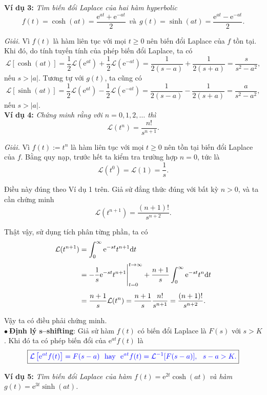 \documentclass[10pt, a4paper]{article}
\begin{document}
	\textbf{Ví dụ 3:} \textit{Tìm biến đổi Laplace của hai hàm hyperbolic} $$f(t)=\cosh(at)=\frac{\mathrm e^{at}+\mathrm e^{-at}}{2}~~\textit{và}~~g(t)=\sinh(at)=\frac{\mathrm e^{at}-\mathrm e^{-at}}{2}.$$
	
	\textit{Giải.} Vì $f(t)$ là hàm liên tục với mọi $t\ge0$ nên biến đổi Laplace của $f$ tồn tại. Khi đó, do tính tuyến tính của phép biến đổi Laplace, ta có $$\mathcal L[\cosh(at)]=\frac12\mathcal L(\mathrm e^{at})+\frac12\mathcal L(\mathrm e^{-at})=\frac{1}{2(s-a)}+\frac{1}{2(s+a)}=\frac{s}{s^2-a^2},$$
	nếu $s>|a|$. Tương tự với $g(t)$, ta cũng có $$\mathcal L[\sinh(at)]=\frac12\mathcal L(\mathrm e^{at})-\frac12\mathcal L(\mathrm e^{-at})=\frac{1}{2(s-a)}-\frac{1}{2(s+a)}=\frac{a}{s^2-a^2},$$
	nếu $s>|a|.$\\
	
	\textbf{Ví dụ 4:} \textit{Chứng minh rằng với $n=0,1,2,\ldots$ thì} $$\mathcal L(t^n)=\frac{n!}{s^{n+1}}.$$
	
	\textit{Giải.} Vì $f(t):=t^n$ là hàm liên tục với mọi $t\ge0$ nên tồn tại biến đổi Laplace của $f$. Bằng quy nạp, trước hết ta kiểm tra trường hợp $n=0$, tức là $$\mathcal L(t^0)=\mathcal L(1)=\frac1s.$$
	
	Điều này đúng theo Ví dụ 1 trên. Giả sử đẳng thức đúng với bất kỳ $n>0$, và ta cần chứng minh $$\mathcal L(t^{n+1})=\frac{(n+1)!}{s^{n+2}}.$$
	
	Thật vậy, sử dụng tích phân từng phần, ta có \begin{align*}
		\mathcal L(t^{n+1})&=\int_0^\infty\mathrm e^{-st}t^{n+1}\mathrm dt\\
		\noalign{\vskip3pt}
		&=-\frac1s\mathrm e^{-st}t^{n+1}\Bigg|_{t=0}^{t\to\infty}+\frac{n+1}{s}\int_0^\infty\mathrm e^{-st}t^n\mathrm dt\\
		\noalign{\vskip5pt}
		&=\frac{n+1}{s}\mathcal L(t^n)=\frac{n+1}{s}\frac{n!}{s^{n+1}}=\frac{(n+1)!}{s^{n+2}}.
	\end{align*}
	
	Vậy ta có điều phải chứng minh.\\
	
	$\bullet~$\textbf{Định lý $\mathbf s$--shifting}: Giả sử hàm $f(t)$ có biến đổi Laplace là $F(s)$ với $s>K$. Khi đó ta có phép biến đổi của $\mathrm e^{at}f(t)$ là $$\boxed{\color{blue}\mathcal L\left[\mathrm e^{at}f(t)\right]=F(s-a)~~\text{hay}~~\mathrm e^{at}f(t)=\mathcal L^{-1}[F(s-a)],~~s-a>K.}$$
	
	\textbf{Ví dụ 5:} \textit{Tìm biến đổi Laplace của hàm $f(t)=\mathrm e^{2t}\cosh(at)$ và hàm $g(t)=\mathrm e^{3t}\sinh(at)$.}\\
	
\end{document}
